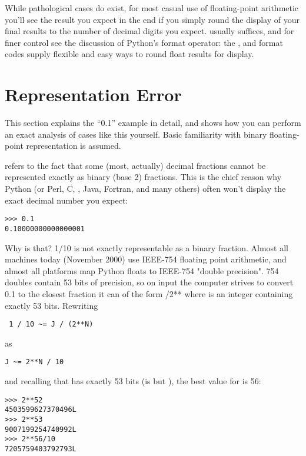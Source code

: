 \documentclass{manual}
\begin{document}
While pathological cases do exist, for most casual use of
floating-point arithmetic you'll see the result you expect in the end
if you simply round the display of your final results to the number of
decimal digits you expect.   usually suffices, and for
finer control see the discussion of Python's \code{\%} format
operator: the ,  and  format codes
supply flexible and easy ways to round float results for display.


\section{Representation Error
         \label{fp-error}}

This section explains the ``0.1'' example in detail, and shows how
you can perform an exact analysis of cases like this yourself.  Basic
familiarity with binary floating-point representation is assumed.

 refers to the fact that some (most, actually)
decimal fractions cannot be represented exactly as binary (base 2)
fractions.  This is the chief reason why Python (or Perl, C, \Cpp,
Java, Fortran, and many others) often won't display the exact decimal
number you expect:

\begin{verbatim}
>>> 0.1
0.10000000000000001
\end{verbatim}

Why is that?  1/10 is not exactly representable as a binary fraction.
Almost all machines today (November 2000) use IEEE-754 floating point
arithmetic, and almost all platforms map Python floats to IEEE-754
"double precision".  754 doubles contain 53 bits of precision, so on
input the computer strives to convert 0.1 to the closest fraction it can
of the form /2** where  is an integer containing
exactly 53 bits.  Rewriting

\begin{verbatim}
 1 / 10 ~= J / (2**N)
\end{verbatim}

as

\begin{verbatim}
J ~= 2**N / 10
\end{verbatim}

and recalling that  has exactly 53 bits (is  but
), the best value for  is 56:

\begin{verbatim}
>>> 2**52
4503599627370496L
>>> 2**53
9007199254740992L
>>> 2**56/10
7205759403792793L
\end{verbatim}
\end{document}
